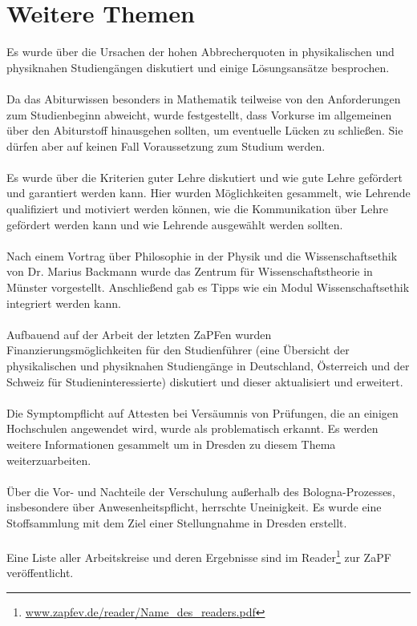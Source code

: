 \section*{Weitere Themen}
Es wurde über die Ursachen der hohen Abbrecherquoten in physikalischen und 
physiknahen Studiengängen diskutiert und einige Lösungsansätze besprochen.
\\ \\
Da das Abiturwissen besonders in Mathematik teilweise von den Anforderungen 
zum Studienbeginn abweicht, wurde festgestellt, dass Vorkurse im allgemeinen 
über den Abiturstoff hinausgehen sollten, um eventuelle Lücken zu schließen. 
Sie dürfen aber auf keinen Fall Voraussetzung zum Studium werden.
\\ \\
Es wurde über die Kriterien guter Lehre diskutiert und wie gute Lehre gefördert 
und garantiert werden kann. Hier 
wurden Möglichkeiten gesammelt, wie Lehrende qualifiziert und motiviert werden 
können, wie die Kommunikation über Lehre gefördert werden kann und wie Lehrende 
ausgewählt werden sollten.
\\ \\
Nach einem Vortrag über Philosophie in der Physik und die Wissenschaftsethik 
von Dr. Marius Backmann wurde das Zentrum für Wissenschaftstheorie in Münster
vorgestellt. Anschließend gab es Tipps wie ein Modul Wissenschaftsethik integriert werden kann.
\\ \\
Aufbauend auf der Arbeit der letzten ZaPFen wurden Finanzierungsmöglichkeiten 
für den Studienführer (eine Übersicht der physikalischen und physiknahen 
Studiengänge in Deutschland, Österreich und der Schweiz für 
Studieninteressierte) diskutiert und dieser aktualisiert und erweitert.
\\ \\
Die Symptompflicht auf Attesten bei Versäumnis von Prüfungen, die an einigen 
Hochschulen angewendet wird, wurde als problematisch erkannt. Es werden weitere 
Informationen gesammelt um in Dresden zu diesem Thema weiterzuarbeiten.
\\ \\
Über die Vor- und Nachteile der Verschulung außerhalb des Bologna-Prozesses, 
insbesondere über Anwesenheitspflicht, herrschte Uneinigkeit. Es wurde eine 
Stoffsammlung mit dem Ziel einer Stellungnahme in Dresden erstellt.
\\ \\
Eine Liste aller Arbeitskreise und deren Ergebnisse sind im
Reader\footnote{\href{http://www.zapfev.de/reader/Name_des_readers.pdf}{\url{www.zapfev.de/reader/Name_des_readers.pdf}}}
zur ZaPF veröffentlicht.

